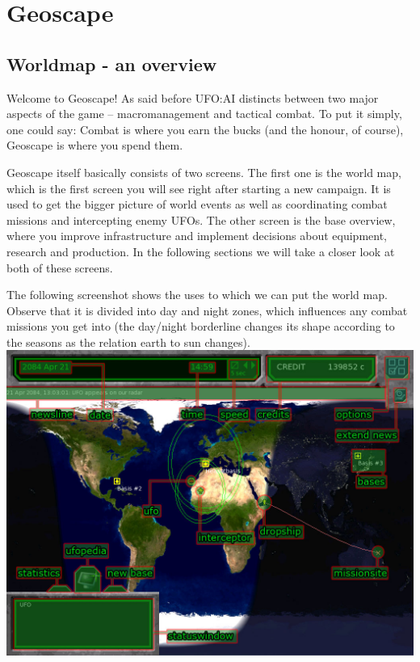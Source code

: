 \section{Geoscape}

\subsection{Worldmap - an overview} 
Welcome to Geoscape! As said before UFO:AI distincts between two major aspects of the game -- macromanagement and tactical combat. To put it simply, one could say: Combat is where you earn the bucks (and the honour, of course), Geoscape is where you spend them.

Geoscape itself basically consists of two screens. The first one is the world map, which is the first screen you will see right after starting a new campaign. It is used to get the bigger picture of world events as well as coordinating combat missions and intercepting enemy UFOs. The other screen is the base overview, where you improve infrastructure and implement decisions about equipment, research and production. In the following sections we will take a closer look at both of these screens.

The following screenshot shows the uses to which we can put the world map. Observe that it is divided into day and night zones, which influences any combat missions you get into (the day/night borderline changes its shape according to the seasons as the relation earth to sun changes).\\

\includegraphics[width=\textwidth]{images/geoscape_final.jpg}

